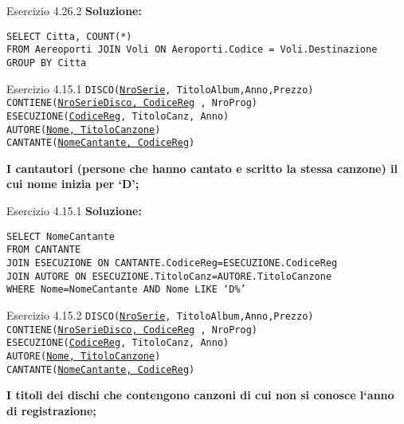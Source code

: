 \begin{frame}{Esercizio 4.26.2}
    \textbf{Soluzione:}
    \vspace{1em}
    
    \texttt{SELECT Citta, COUNT(*)\\FROM Aereoporti JOIN Voli ON Aeroporti.Codice = Voli.Destinazione \\GROUP BY Citta}
    \end{frame}
\begin{frame}{Esercizio 4.15.1}
    \texttt{DISCO(\underline{NroSerie}, TitoloAlbum,Anno,Prezzo)\\
    CONTIENE(\underline{NroSerieDisco, CodiceReg} , NroProg)\\
    ESECUZIONE(\underline{CodiceReg}, TitoloCanz, Anno)\\
    AUTORE(\underline{Nome, TitoloCanzone})\\
    CANTANTE(\underline{NomeCantante, CodiceReg})}
    \vspace{1em}
    
    \textbf{I cantautori (persone che hanno cantato e scritto la stessa canzone) il cui nome inizia per `D';}
\end{frame}

\begin{frame}{Esercizio 4.15.1}
    \textbf{Soluzione:}
    \vspace{1em}
    
    \texttt{SELECT NomeCantante\\FROM CANTANTE \\JOIN ESECUZIONE ON CANTANTE.CodiceReg=ESECUZIONE.CodiceReg\\JOIN AUTORE ON ESECUZIONE.TitoloCanz=AUTORE.TitoloCanzone\\WHERE Nome=NomeCantante AND Nome LIKE `D\%'}
    \end{frame}
\begin{frame}{Esercizio 4.15.2}
    \texttt{DISCO(\underline{NroSerie}, TitoloAlbum,Anno,Prezzo)\\
    CONTIENE(\underline{NroSerieDisco, CodiceReg} , NroProg)\\
    ESECUZIONE(\underline{CodiceReg}, TitoloCanz, Anno)\\
    AUTORE(\underline{Nome, TitoloCanzone})\\
    CANTANTE(\underline{NomeCantante, CodiceReg})}
    \vspace{1em}
    
    \textbf{I titoli dei dischi che contengono canzoni di cui non si conosce l`anno di registrazione;}
\end{frame}

